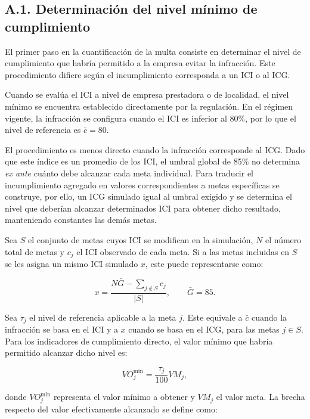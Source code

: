 \subsection*{A.1. Determinación del nivel mínimo de cumplimiento}

El primer paso en la cuantificación de la multa consiste en determinar el nivel de cumplimiento que habría permitido a la empresa evitar la infracción. Este procedimiento difiere según el incumplimiento corresponda a un ICI o al ICG.

Cuando se evalúa el ICI a nivel de empresa prestadora o de localidad, el nivel mínimo se encuentra establecido directamente por la regulación. En el régimen vigente, la infracción se configura cuando el ICI es inferior al 80\%, por lo que el nivel de referencia es \(\bar c=80\).

El procedimiento es menos directo cuando la infracción corresponde al ICG. Dado que este índice es un promedio de los ICI, el umbral global de 85\% no determina \textit{ex ante} cuánto debe alcanzar cada meta individual. Para traducir el incumplimiento agregado en valores correspondientes a metas específicas se construye, por ello, un ICG simulado igual al umbral exigido y se determina el nivel que deberían alcanzar determinados ICI para obtener dicho resultado, manteniendo constantes las demás metas.

Sea \(S\) el conjunto de metas cuyos ICI se modifican en la simulación, \(N\) el número total de metas y \(c_j\) el ICI observado de cada meta. Si a las metas incluidas en \(S\) se les asigna un mismo ICI simulado \(x\), este puede representarse como:

\begin{equation}
\label{eq:anexo_ici_simulado_icg}
x
=
\frac{
N\bar G
-
\displaystyle\sum_{j\notin S}c_j
}{
|S|
},
\qquad
\bar G=85.
\end{equation}

Sea \(\tau_j\) el nivel de referencia aplicable a la meta \(j\). Este equivale a \(\bar c\) cuando la infracción se basa en el ICI y a \(x\) cuando se basa en el ICG, para las metas \(j\in S\). Para los indicadores de cumplimiento directo, el valor mínimo que habría permitido alcanzar dicho nivel es:

\begin{equation}
\label{eq:anexo_valor_minimo}
VO_j^{\min}
=
\frac{\tau_j}{100}
VM_j,
\end{equation}

donde \(VO_j^{\min}\) representa el valor mínimo a obtener y \(VM_j\) el valor meta. La brecha respecto del valor efectivamente alcanzado se define como:

